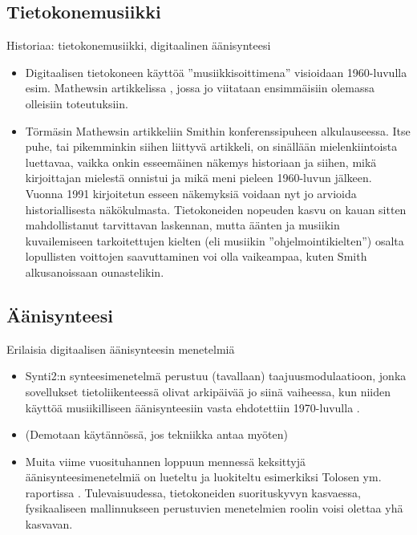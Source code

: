 \documentclass[pdf,9pt,handout]{beamer}
\begin{document}
\subsection{Tietokonemusiikki}
\begin{frame}{Historiaa: tietokonemusiikki, digitaalinen äänisynteesi}
  \begin{itemize}
    \item
  Digitaalisen tietokoneen käyttöä ''musiikkisoittimena'' visioidaan
  1960-luvulla esim. Mathewsin artikkelissa
  \cite{Mathews63thedigital}, jossa jo viitataan ensimmäisiin olemassa
  olleisiin toteutuksiin.

    \item
  Törmäsin Mathewsin artikkeliin Smithin konferenssipuheen
  \cite{smith1991viewpoints} alkulauseessa. Itse puhe, tai pikemminkin siihen
  liittyvä artikkeli, on sinällään mielenkiintoista luettavaa, vaikka
  onkin esseemäinen näkemys historiaan ja siihen, mikä kirjoittajan
  mielestä onnistui ja mikä meni pieleen 1960-luvun jälkeen. Vuonna
  1991 kirjoitetun esseen näkemyksiä voidaan nyt jo arvioida
  historiallisesta näkökulmasta. Tietokoneiden nopeuden kasvu on kauan
  sitten mahdollistanut tarvittavan laskennan, mutta äänten ja
  musiikin kuvailemiseen tarkoitettujen kielten (eli
  musiikin ''ohjelmointikielten'') osalta lopullisten voittojen
  saavuttaminen voi olla vaikeampaa, kuten Smith alkusanoissaan
  ounastelikin.
  \end{itemize}
\end{frame}

\subsection{Äänisynteesi}
\begin{frame}{Erilaisia digitaalisen äänisynteesin menetelmiä}
\begin{itemize}
\item
  Synti2:n synteesimenetelmä perustuu (tavallaan) taajuusmodulaatioon,
  jonka sovellukset tietoliikenteessä olivat arkipäivää jo siinä
  vaiheessa, kun niiden käyttöä musiikilliseen äänisynteesiin vasta
  ehdotettiin 1970-luvulla \cite{chowning1973fm}.

\item[]
  (Demotaan käytännössä, jos tekniikka antaa myöten)

\item
  Muita viime vuosituhannen loppuun mennessä keksittyjä
  äänisynteesimenetelmiä on lueteltu ja luokiteltu esimerkiksi Tolosen
  ym. raportissa \cite{TolonenEtal1998evaluation}. Tulevaisuudessa,
  tietokoneiden suorituskyvyn kasvaessa, fysikaaliseen mallinnukseen
  perustuvien menetelmien roolin voisi olettaa yhä kasvavan.

\end{itemize}

\end{frame}
\end{document}

